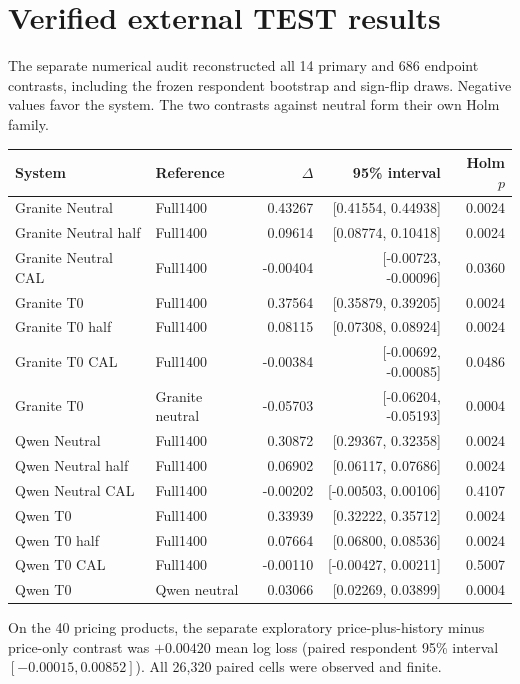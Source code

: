\documentclass[10pt]{article}
\begin{document}
\section{Verified external TEST results}
\noindent The separate numerical audit reconstructed all 14 primary and 686 endpoint contrasts, including the frozen respondent bootstrap and sign-flip draws. Negative values favor the system. The two contrasts against neutral form their own Holm family.
\begin{center}\small\begin{tabular}{llrrr}\toprule System & Reference & $\Delta$ & 95\% interval & Holm $p$\\ \midrule
Granite Neutral & Full1400 & 0.43267 & [0.41554, 0.44938] & 0.0024\\
Granite Neutral half & Full1400 & 0.09614 & [0.08774, 0.10418] & 0.0024\\
Granite Neutral CAL & Full1400 & -0.00404 & [-0.00723, -0.00096] & 0.0360\\
Granite T0 & Full1400 & 0.37564 & [0.35879, 0.39205] & 0.0024\\
Granite T0 half & Full1400 & 0.08115 & [0.07308, 0.08924] & 0.0024\\
Granite T0 CAL & Full1400 & -0.00384 & [-0.00692, -0.00085] & 0.0486\\
Granite T0 & Granite neutral & -0.05703 & [-0.06204, -0.05193] & 0.0004\\
Qwen Neutral & Full1400 & 0.30872 & [0.29367, 0.32358] & 0.0024\\
Qwen Neutral half & Full1400 & 0.06902 & [0.06117, 0.07686] & 0.0024\\
Qwen Neutral CAL & Full1400 & -0.00202 & [-0.00503, 0.00106] & 0.4107\\
Qwen T0 & Full1400 & 0.33939 & [0.32222, 0.35712] & 0.0024\\
Qwen T0 half & Full1400 & 0.07664 & [0.06800, 0.08536] & 0.0024\\
Qwen T0 CAL & Full1400 & -0.00110 & [-0.00427, 0.00211] & 0.5007\\
Qwen T0 & Qwen neutral & 0.03066 & [0.02269, 0.03899] & 0.0004\\
\bottomrule\end{tabular}\end{center}
\noindent On the 40 pricing products, the separate exploratory price-plus-history minus price-only contrast was $+0.00420$ mean log loss (paired respondent 95\% interval $[-0.00015,0.00852]$). All 26,320 paired cells were observed and finite.
\end{document}
